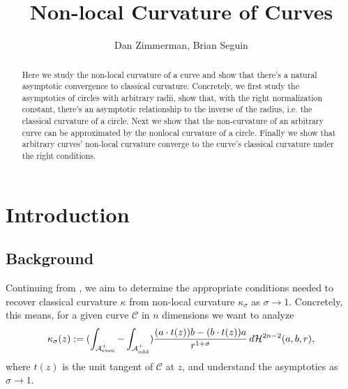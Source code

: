 \documentclass{article}
\newcommand{\aeven}{\mathcal{A}_{\mathrm{even}}^+}
\newcommand{\aodd}{\mathcal{A}_{\mathrm{odd}}^+}
\renewcommand{\dot}[2]{{#1}\cdot{#2}}
\newcommand{\pdot}[2]{\parens{\dot{#1}{#2}}}
\begin{document}
\title{\Huge Non-local Curvature of Curves}
\author{Dan Zimmerman, Brian Seguin}
\date{}
\setlength{\droptitle}{-6em}
\maketitle

\begin{abstract}
  Here we study the non-local curvature of a curve and show that there's a natural asymptotic convergence to classical curvature. Concretely, we first study the asymptotics of circles with arbitrary radii, show that, with the right normalization constant, there's an asymptotic relationship to the inverse of the radius, i.e. the classical curvature of a circle. Next we show that the non-curvature of an arbitrary curve can be approximated by the nonlocal curvature of a circle. Finally we show that arbitrary curves' non-local curvature converge to the curve's classical curvature under the right conditions.
\end{abstract}

\doublespacing
\tableofcontents
\singlespacing


\section{Introduction}%
\subsection{Background}
Continuing from \cite{seguin:2020}, we aim to determine the appropriate conditions needed to recover classical curvature $\kappa$ from non-local curvature $\kappa_\sigma$ as $\sigma \to 1$. Concretely, this means, for a given curve $\mathcal{C}$ in $n$ dimensions we want to analyze
\begin{equation}
  \kappa_\sigma(z) := \parens{\int_{\aeven} - \int_{\aodd}} \frac{\pdot{a}{t(z)} b - \pdot{b}{t(z)}a}{r^{1+\sigma}} \, d\mathcal{H}^{2n-2}\parens{a, b, r}, \label{def:non-local-curv}
\end{equation}
where $t(z)$ is the unit tangent of $\mathcal{C}$ at $z$, and understand the asymptotics as $\sigma \to 1$.
\end{document}
